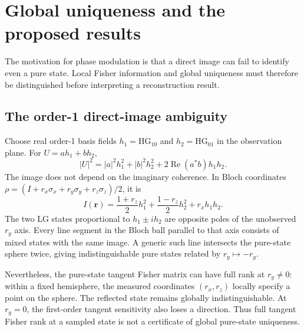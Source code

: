 \documentclass[11pt,a4paper]{article}
\newcommand{\RePart}{\operatorname{Re}}
\begin{document}
\section{Global uniqueness and the proposed results}\label{sec:uniqueness}
The motivation for phase modulation is that a direct image can fail to
identify even a pure state. Local Fisher information and global uniqueness
must therefore be distinguished before interpreting a reconstruction result.

\subsection{The order-1 direct-image ambiguity}
Choose real order-1 basis fields $h_1=\mathrm{HG}_{10}$ and
$h_2=\mathrm{HG}_{01}$ in the observation plane. For
$U=a h_1+b h_2$,
\begin{equation}
 |U|^2=|a|^2h_1^2+|b|^2h_2^2
 +2\RePart(a^*b)h_1h_2.
\end{equation}
The image does not depend on the imaginary coherence. In Bloch coordinates
$\rho=(I+r_x\sigma_x+r_y\sigma_y+r_z\sigma_z)/2$, it is
\begin{equation}
 I(\mathbf r)=\frac{1+r_z}{2}h_1^2+
 \frac{1-r_z}{2}h_2^2+r_xh_1h_2.
\end{equation}
The two LG states proportional to $h_1\pm i h_2$ are opposite poles of
the unobserved $r_y$ axis. Every line segment in the Bloch ball parallel
to that axis consists of mixed states with the same image. A generic such
line intersects the pure-state sphere twice, giving indistinguishable
pure states related by $r_y\mapsto-r_y$.

Nevertheless, the pure-state tangent Fisher matrix can have full rank at
$r_y\ne0$: within a fixed hemisphere, the measured coordinates $(r_x,r_z)$
locally specify a point on the sphere. The reflected state remains globally
indistinguishable. At $r_y=0$, the first-order tangent sensitivity also loses
a direction. Thus full tangent Fisher rank at a sampled state is not a
certificate of global pure-state uniqueness.
\end{document}
